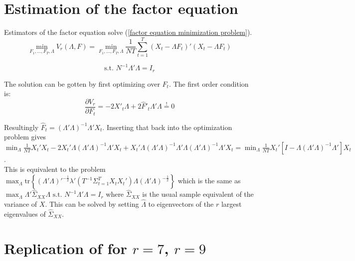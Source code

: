 \documentclass[12pt]{article}
\begin{document}
\newpage
\section{Estimation of the factor equation}
\label{Estimation of the Factor Equation}
Estimators of the factor equation solve (\ref{factor equation minimization problem}).
$$\min_{F_1, ..., F_T, \Lambda} V_r(\Lambda, F) = \min_{F_1, ..., F_T, \Lambda} \frac{1}{NT} \sum_{t=1}^T (X_t - \Lambda F_t)'(X_t - \Lambda F_t)$$

$$\text{s.t. } N^{-1} \Lambda' \Lambda = I_r$$

The solution can be gotten by first optimizing over $F_t$. The first order condition is: $$\frac{\partial V_r}{\partial F_t} = -2X'_t \Lambda + 2 \hat F'_t \Lambda' \Lambda \overset{!}{=} 0$$

Resultingly $\hat F_t = (\Lambda' \Lambda)^{-1} \Lambda' X_t$. Inserting that back into the optimization problem gives $\min_\Lambda \frac{1}{NT} X_t'X_t - 2X_t' \Lambda (\Lambda' \Lambda)^{-1} \Lambda'X_t + X_t' \Lambda (\Lambda' \Lambda)^{-1} \Lambda' \Lambda (\Lambda' \Lambda)^{-1} \Lambda'X_t = \min_\Lambda \frac{1}{NT} X_t' [I - \Lambda (\Lambda' \Lambda)^{-1} \Lambda']X_t$. \\
This is equivalent to the problem $\max_\Lambda \text{tr}\left\{(\Lambda'\Lambda)'^{-\frac{1}{2}}\lambda'(T^{-1} \Sigma_{t=1}^T X_tX_t') \Lambda (\Lambda' \Lambda)^{-\frac{1}{2}}\right\}$ which is the same as $\max_\Lambda \Lambda' \hat \Sigma_{XX} \Lambda \text{ s.t. } N^{-1} \Lambda' \Lambda = I_r$ where $\hat \Sigma_{XX}$ is the usual sample equivalent of the variance of $X$. This can be solved by setting $\hat \Lambda$ to eigenvectors of the $r$ largest eigenvalues of $\hat \Sigma_{XX}$.


\newpage
\section{Replication of \citet{bai2002determining} for $r=7$, $r=9$}
\end{document}
